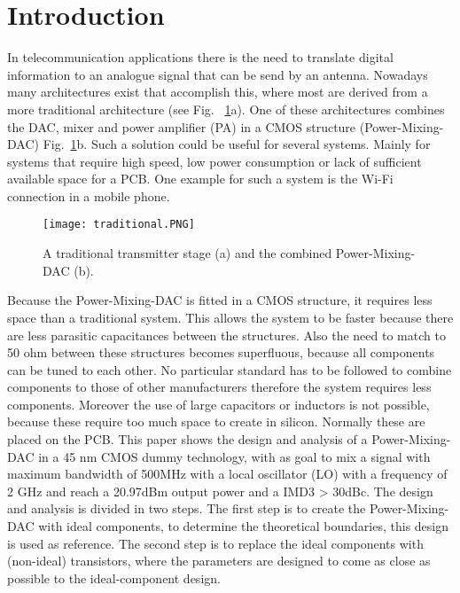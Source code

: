 \section{Introduction} \label{sec:introduction}
In telecommunication applications there is the need to translate digital information to an analogue signal that can be send by an antenna. Nowadays many architectures exist that accomplish this, where most are derived from a more traditional architecture (see Fig. ~\ref{fig:traditional}a). One of these architectures combines the DAC, mixer and power amplifier (PA) in a CMOS structure (Power-Mixing-DAC) Fig.~\ref{fig:traditional}b. Such a solution could be useful for several systems. Mainly for systems that require high speed, low power consumption or lack of sufficient available space for a PCB. One example for such a system is the Wi-Fi connection in a mobile phone.
\begin{figure}[h]
\texttt{[image: traditional.PNG]}
\caption{A traditional transmitter stage (a) and the combined Power-Mixing-DAC (b). ~\cite{powerdac}}
\label{fig:traditional}
\end{figure} 
Because the Power-Mixing-DAC is fitted in a CMOS structure, it requires less space than a traditional system. This allows the system to be faster because there are less parasitic capacitances between the structures. Also the need to match to 50 ohm between these structures becomes superfluous, because all components can be tuned to each other. No particular standard has to be followed to combine components to those of other manufacturers therefore the system requires less components. Moreover the use of large capacitors or inductors is not possible, because these require too much space to create in silicon. Normally these are placed on the PCB.
This paper shows the design and analysis of a Power-Mixing-DAC in a 45 nm CMOS dummy technology, with as goal to mix a signal with maximum bandwidth of 500MHz with a local oscillator (LO) with a frequency of 2 GHz and reach a 20.97dBm output power and a IMD3 > 30dBc. The design and analysis is divided in two steps. The first step is to create the Power-Mixing-DAC with ideal components, to determine the theoretical boundaries, this design is used as reference. The second step is to replace the ideal components with (non-ideal) transistors, where the parameters are designed to come as close as possible to the ideal-component design.
